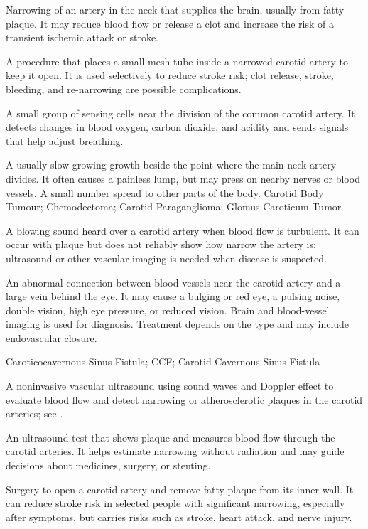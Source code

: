  Narrowing of an artery in the neck that supplies the brain, usually from fatty plaque. It may reduce blood flow or release a clot and increase the risk of a transient ischemic attack or stroke.

 A procedure that places a small mesh tube inside a narrowed carotid artery to keep it open. It is used selectively to reduce stroke risk; clot release, stroke, bleeding, and re-narrowing are possible complications.

 A small group of sensing cells near the division of the common carotid artery. It detects changes in blood oxygen, carbon dioxide, and acidity and sends signals that help adjust breathing.

 A usually slow-growing growth beside the point where the main neck artery divides. It often causes a painless lump, but may press on nearby nerves or blood vessels. A small number spread to other parts of the body.
\synonyms
Carotid Body Tumour; Chemodectoma; Carotid Paraganglioma; Glomus Caroticum Tumor

 A blowing sound heard over a carotid artery when blood flow is turbulent. It can occur with plaque but does not reliably show how narrow the artery is; ultrasound or other vascular imaging is needed when disease is suspected.

 An abnormal connection between blood vessels near the carotid artery and a large vein behind the eye. It may cause a bulging or red eye, a pulsing noise, double vision, high eye pressure, or reduced vision. Brain and blood-vessel imaging is used for diagnosis. Treatment depends on the type and may include endovascular closure.

\synonyms
Caroticocavernous Sinus Fistula; CCF; Carotid-Cavernous Sinus Fistula

 A noninvasive vascular ultrasound using sound waves and Doppler effect to evaluate blood flow and detect narrowing or atherosclerotic plaques in the carotid arteries; see .

 An ultrasound test that shows plaque and measures blood flow through the carotid arteries. It helps estimate narrowing without radiation and may guide decisions about medicines, surgery, or stenting.

 Surgery to open a carotid artery and remove fatty plaque from its inner wall. It can reduce stroke risk in selected people with significant narrowing, especially after symptoms, but carries risks such as stroke, heart attack, and nerve injury.

